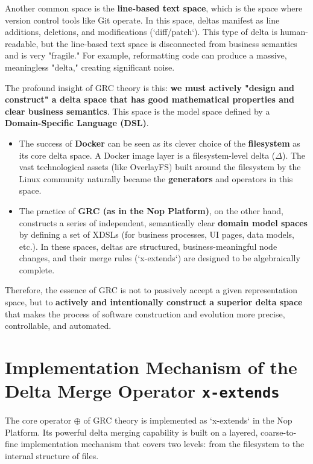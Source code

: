\documentclass[11pt]{article}
\begin{document}
Another common space is the \textbf{line-based text space}, which is the space where version control tools like Git operate. In this space, deltas manifest as line additions, deletions, and modifications (`diff/patch`). This type of delta is human-readable, but the line-based text space is disconnected from business semantics and is very "fragile." For example, reformatting code can produce a massive, meaningless "delta," creating significant noise.

The profound insight of GRC theory is this: \textbf{we must actively "design and construct" a delta space that has good mathematical properties and clear business semantics}. This space is the model space defined by a \textbf{Domain-Specific Language (DSL)}.

\begin{itemize}
    \item The success of \textbf{Docker} can be seen as its clever choice of the \textbf{filesystem} as its core delta space. A Docker image layer is a filesystem-level delta ($\Delta$). The vast technological assets (like OverlayFS) built around the filesystem by the Linux community naturally became the \textbf{generators} and operators in this space.
    \item The practice of \textbf{GRC (as in the Nop Platform)}, on the other hand, constructs a series of independent, semantically clear \textbf{domain model spaces} by defining a set of XDSLs (for business processes, UI pages, data models, etc.). In these spaces, deltas are structured, business-meaningful node changes, and their merge rules (`x-extends`) are designed to be algebraically complete.
\end{itemize}

Therefore, the essence of GRC is not to passively accept a given representation space, but to \textbf{actively and intentionally construct a superior delta space} that makes the process of software construction and evolution more precise, controllable, and automated.

\section{Implementation Mechanism of the Delta Merge Operator \texttt{x-extends}}

The core operator $\oplus$ of GRC theory is implemented as `x-extends` in the Nop Platform. Its powerful delta merging capability is built on a layered, coarse-to-fine implementation mechanism that covers two levels: from the filesystem to the internal structure of files.
\end{document}
